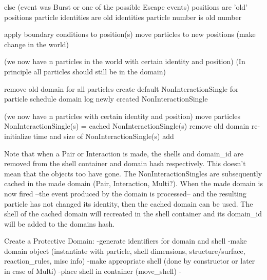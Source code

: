 \documentclass[a4paper, 11pt]{article}
\begin{document}
  else
    (event was Burst or one of the possible Escape events)
    positions are 'old' positions
    particle identities are old identities
    particle number is old number

    apply boundary conditions to position(s)
    move particles to new positions (make change in the world)

  (we now have n particles in the world with certain identity and position)
  (In principle all particles should still be in the domain)

  remove old domain 
  for all particles
    create default NonInteractionSingle for particle
    schedule domain
    log newly created NonInteractionSingle



    (we now have n particles with certain identity and position)
    move particles
    NonInteractionSingle(s) = cached NonInteractionSingle(s)
    remove old domain
    re-initialize time and size of NonInteractionSingle(s)
    add 




Note that when a Pair or Interaction is made, the shells and domain\_id are removed from the shell container and
domain hash respectively. This doesn't mean that the objects too have gone. The NonInteractionSingles are subsequently
cached in the made domain (Pair, Interaction, Multi?). When the made domain is now fired --the event produced by the
domain is processed-- and the resulting particle has not changed its identity, then the cached domain can be used. The
shell of the cached domain will recreated in the shell container and its domain\_id will be added to the domains hash.



Create a Protective Domain:
-generate identifiers for domain and shell
-make domain object (instantiate with particle, shell dimensions, structure/surface, reaction\_rules, misc info)
 -make appropriate shell (done by constructor or later in case of Multi)
-place shell in container (move\_shell)
-
\end{document}
